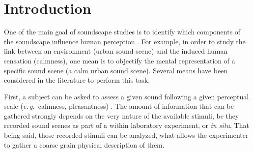 \documentclass[12pt]{elsarticle}
\newcommand{\eg}{\emph{e.\,g.}}
\begin{document}
\setlength{\parindent}{5ex}

\section{Introduction}
\label{sec:intro}


One of the main goal of soundscape studies is to identify which components of the soundscape influence human perception \cite{aletta2016soundscape}. For example, in order to study the link between an environment (urban sound scene) and the induced human sensation (calmness), one mean is to objectify the mental representation of a specific sound scene (a calm urban sound scene). Several means have been considered in the literature to perform this task.


First, a subject can be asked to assess a given sound following a given perceptual scale (\eg~calmness, pleasantness) \cite{axelsson2005soundscape,davies2013perception,cain2013development}. The amount of information that can be gathered strongly depends on the very nature of the available stimuli, be they recorded sound scenes as part of a within laboratory experiment, or \emph{in situ}. That being said, those recorded stimuli  can be analyzed, what allows the experimenter to gather a coarse
grain physical description of them.

\end{document}
